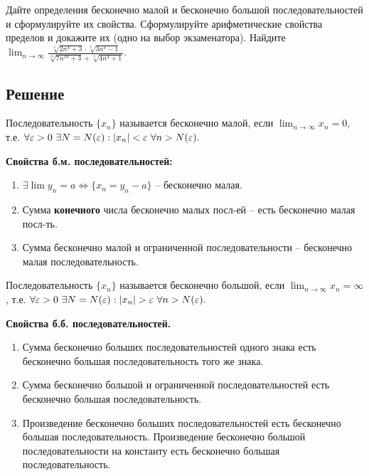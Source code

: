 Дайте определения бесконечно малой и бесконечно большой последовательностей и сформулируйте их свойства. Сформулируйте арифметические свойства пределов и докажите их (одно на
выбор экзаменатора). Найдите $\displaystyle \lim_{n\rightarrow \infty} 
        \frac{
               \sqrt[5]{2n^4 + 3} \cdot 
               \sqrt[7]{3n^3 - 1}
             }
             {
               \sqrt[15]{7n^{18} + 3} + 
               \sqrt[3]{4n^4 + 1}
             }.$

\subsection*{Решение}

\begin{definition} Последовательность $ \{ x_ n \} $ называется бесконечно малой, 
    если $\displaystyle \lim_{n \rightarrow \infty} x_n = 0$, т.е. 
    $\forall \varepsilon > 0\ \exists N = N(\varepsilon):|x_n| < \varepsilon\ \forall n > N(\varepsilon).$
\end{definition}

\textbf{Свойства б.м. последовательностей:}
    \begin{enumerate}
        \item $\exists \lim y_n = a \Leftrightarrow \{x_n = y_n - a\}$ -- бесконечно малая.
        \item Сумма \textbf{конечного} числа бесконечно малых посл-ей -- есть бесконечно малая посл-ть.
        \item Сумма бесконечно малой и ограниченной последовательности -- бесконечно малая последовательность.
    \end{enumerate}

\begin{definition} Последовательность $ \{ x_ n \} $ называется бесконечно большой, 
    если $\displaystyle \lim_{n \rightarrow \infty} x_n = \infty$, т.е. 
    $\forall \varepsilon > 0\ \exists N = N(\varepsilon):|x_n| > \varepsilon\ \forall n > N(\varepsilon).$
\end{definition}
\textbf{Свойства б.б. последовательностей.}
    \begin{enumerate}
        \item Сумма бесконечно больших последовательностей одного знака есть бесконечно большая последовательность того же знака.
        \item Сумма бесконечно большой и ограниченной последовательностей есть бесконечно большая последовательность.
        \item Произведение бесконечно больших последовательностей есть бесконечно большая последовательность. Произведение бесконечно большой последовательности на константу есть бесконечно большая последовательность.
    \end{enumerate}

